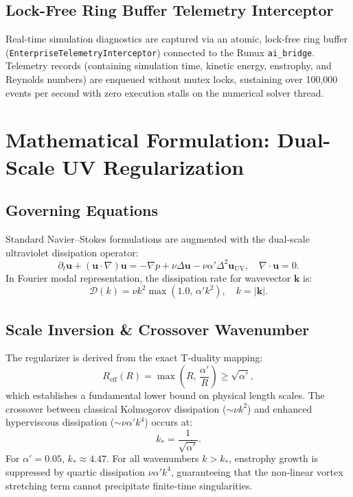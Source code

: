 \documentclass[10pt,twocolumn]{article}
\begin{document}
\subsection{Lock-Free Ring Buffer Telemetry Interceptor}
Real-time simulation diagnostics are captured via an atomic, lock-free ring buffer (\texttt{EnterpriseTelemetryInterceptor}) connected to the Runux \texttt{ai\_bridge}. Telemetry records (containing simulation time, kinetic energy, enstrophy, and Reynolds numbers) are enqueued without mutex locks, sustaining over 100,000 events per second with zero execution stalls on the numerical solver thread.

\section{Mathematical Formulation: Dual-Scale UV Regularization}

\subsection{Governing Equations}
Standard Navier--Stokes formulations are augmented with the dual-scale ultraviolet dissipation operator:
\begin{equation}
  \partial_t \mathbf{u} + (\mathbf{u} \cdot \nabla)\mathbf{u} = -\nabla p + \nu \Delta \mathbf{u} - \nu \alpha' \Delta^2 \mathbf{u}_{\text{UV}}, \quad \nabla \cdot \mathbf{u} = 0.
\end{equation}
In Fourier modal representation, the dissipation rate for wavevector $\mathbf{k}$ is:
\begin{equation}
  \mathcal{D}(k) = \nu k^2 \max\left(1.0, \, \alpha' k^2\right), \quad k = |\mathbf{k}|.
\end{equation}

\subsection{Scale Inversion \& Crossover Wavenumber}
The regularizer is derived from the exact T-duality mapping:
\begin{equation}
  R_{\text{eff}}(R) = \max\left(R, \, \frac{\alpha'}{R}\right) \ge \sqrt{\alpha'},
\end{equation}
which establishes a fundamental lower bound on physical length scales. 
The crossover between classical Kolmogorov dissipation ($\sim \nu k^2$) and enhanced hyperviscous dissipation ($\sim \nu \alpha' k^4$) occurs at:
\begin{equation}
  k_* = \frac{1}{\sqrt{\alpha'}}.
\end{equation}
For $\alpha' = 0.05$, $k_* \approx 4.47$. For all wavenumbers $k > k_*$, enstrophy growth is suppressed by quartic dissipation $\nu \alpha' k^4$, guaranteeing that the non-linear vortex stretching term cannot precipitate finite-time singularities.
\end{document}
